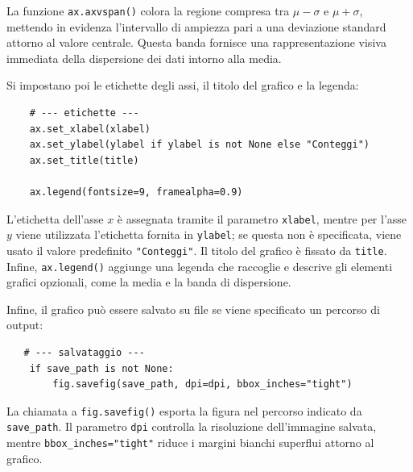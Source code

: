 La funzione \texttt{ax.axvspan()} colora la regione compresa tra
\( \mu - \sigma \) e \( \mu + \sigma \), mettendo in evidenza
l'intervallo di ampiezza pari a una deviazione standard attorno al valore centrale. Questa banda fornisce una rappresentazione visiva immediata della dispersione dei dati intorno alla media.

Si impostano poi le etichette degli assi, il titolo del grafico e la legenda:

\begin{verbatim}
    # --- etichette ---
    ax.set_xlabel(xlabel)
    ax.set_ylabel(ylabel if ylabel is not None else "Conteggi")
    ax.set_title(title)

    ax.legend(fontsize=9, framealpha=0.9)
\end{verbatim}
L'etichetta dell'asse \(x\) è assegnata tramite il parametro \texttt{xlabel}, mentre per l'asse \(y\) viene utilizzata l'etichetta fornita in \texttt{ylabel}; se questa non è specificata, viene usato il valore predefinito \texttt{"Conteggi"}. Il titolo del grafico è fissato da \texttt{title}. Infine, \texttt{ax.legend()} aggiunge una legenda che raccoglie e descrive gli elementi grafici opzionali, come la media e la banda di dispersione.

Infine, il grafico può essere salvato su file se viene specificato un
percorso di output:

\begin{verbatim}
   # --- salvataggio ---
    if save_path is not None:
        fig.savefig(save_path, dpi=dpi, bbox_inches="tight")
\end{verbatim}

La chiamata a \texttt{fig.savefig()} esporta la figura nel percorso indicato da \texttt{save\_path}. Il parametro \texttt{dpi} controlla la risoluzione dell'immagine salvata, mentre \texttt{bbox\_inches="tight"} riduce i margini bianchi superflui attorno al grafico.


\hfill